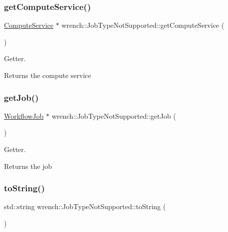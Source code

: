 \subsubsection{\texorpdfstring{get\+Compute\+Service()}{getComputeService()}}
{\footnotesize\ttfamily \hyperlink{classwrench_1_1_compute_service}{Compute\+Service} $\ast$ wrench\+::\+Job\+Type\+Not\+Supported\+::get\+Compute\+Service (\begin{DoxyParamCaption}{ }\end{DoxyParamCaption})}



Getter. 

\begin{DoxyReturn}{Returns}
the compute service 
\end{DoxyReturn}
\mbox{\label{classwrench_1_1_job_type_not_supported_ade89cf1d1f2a676f5d552b909ef30e5e}} 
\subsubsection{\texorpdfstring{get\+Job()}{getJob()}}
{\footnotesize\ttfamily \hyperlink{classwrench_1_1_workflow_job}{Workflow\+Job} $\ast$ wrench\+::\+Job\+Type\+Not\+Supported\+::get\+Job (\begin{DoxyParamCaption}{ }\end{DoxyParamCaption})}



Getter. 

\begin{DoxyReturn}{Returns}
the job 
\end{DoxyReturn}
\mbox{\label{classwrench_1_1_job_type_not_supported_ab6a302367f2db332484da0c256e3ae5c}} 
\subsubsection{\texorpdfstring{to\+String()}{toString()}}
{\footnotesize\ttfamily std\+::string wrench\+::\+Job\+Type\+Not\+Supported\+::to\+String (\begin{DoxyParamCaption}{ }\end{DoxyParamCaption})\hspace{0.3cm}{\ttfamily [virtual]}}



